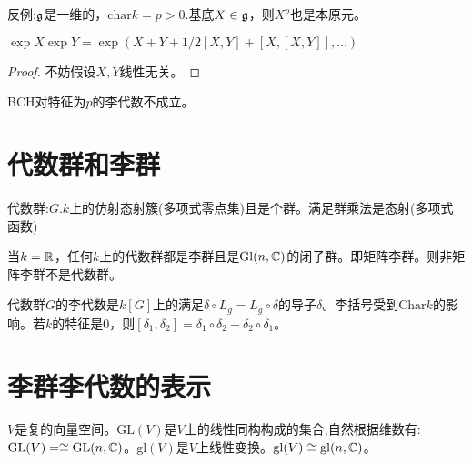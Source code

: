 \begin{example}
    反例:$\mathfrak{g}$是一维的，$\mathrm{char}k=p>0$.基底$X \in \mathfrak{g}$，则$X^p$也是本原元。
\end{example}
\begin{theorem}[BCH公式]
    $\exp X \exp Y=\exp(X+Y+1/2[X,Y]+[X,[X,Y]],\dots)$
\end{theorem}
\begin{proof}
    不妨假设$X,Y$线性无关。
\end{proof}
\begin{remark}
    BCH对特征为$p$的李代数不成立。
\end{remark}
\section{代数群和李群}
\begin{definition}
    代数群:$G$.$k$上的仿射态射簇(多项式零点集)且是个群。满足群乘法是态射(多项式函数)
\end{definition}
\begin{proposition}
    当$k=\mathbb{R}$，任何$k$上的代数群都是李群且是$\mathrm{Gl}(n,\mathbb{C})$的闭子群。即矩阵李群。则非矩阵李群不是代数群。
\end{proposition}
代数群$G$的李代数是$k[G]$上的满足$\delta \circ L_g=L_g \circ \delta$的导子$\delta$。李括号受到$\mathrm{Char}k$的影响。若$k$的特征是$0$，则$[\delta_1,\delta_2]=\delta_1\circ \delta_2-\delta_2 \circ \delta_1$。
\section{李群李代数的表示}
$V$是复的向量空间。$\mathrm{GL}(V)$是$V$上的线性同构构成的集合,自然根据维数有:$\mathrm{GL}(V)=\cong \mathrm{GL}(n,\mathbb{C})$。$\mathrm{gl}(V)$是$V$上线性变换。$\mathrm{gl}(V)\cong \mathrm{gl}(n,\mathbb{C})$。

